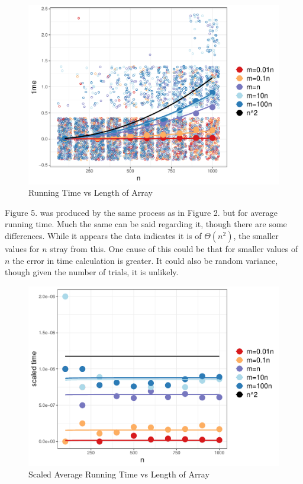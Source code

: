 \documentclass{article}
\begin{document}
\begin{figure}[htbp]
\includegraphics{report-plot4}
\caption{Running Time vs Length of Array}
\end{figure}

\pagebreak

Figure 5. was produced by the same process as in Figure 2. but for average running time. Much the same can be said regarding it, though there are some differences. While it appears the data indicates it is of $\Theta(n^2)$, the smaller values for $n$ stray from this. One cause of this could be that for smaller values of $n$ the error in time calculation is greater. It could also be random variance, though given the number of trials, it is unlikely.

\begin{figure}[htbp]
\includegraphics{report-plot5}
\caption{Scaled Average Running Time vs Length of Array}
\end{figure}
\end{document}
